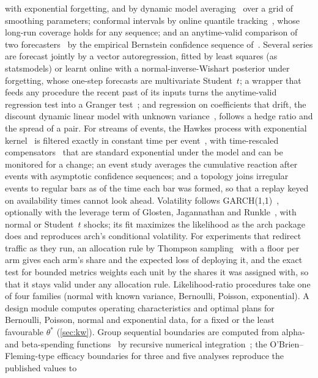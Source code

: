 \documentclass[11pt,a4paper]{article}
\theoremstyle{definition}
\theoremstyle{remark}
\begin{document}
with exponential forgetting, and by dynamic model
averaging~\cite{raftery2010} over a grid of smoothing parameters;
conformal intervals by online quantile
tracking~\cite{gibbs2021,angelopoulos2023}, whose long-run coverage holds
for any sequence; and an anytime-valid comparison of two
forecasters~\cite{choe2024} by the empirical Bernstein confidence
sequence of~\cite{howard2021}. Several series are forecast jointly by a
vector autoregression, fitted by least squares (as statsmodels) or learnt
online with a normal-inverse-Wishart posterior under forgetting, whose
one-step forecasts are multivariate Student~$t$; a wrapper that feeds any
procedure the recent past of its inputs turns the anytime-valid
regression test into a Granger test~\cite{granger1969}; and regression on
coefficients that drift, the discount dynamic linear model with unknown
variance~\cite{west1997}, follows a hedge ratio and the spread of a pair.
For streams of events, the Hawkes process with exponential
kernel~\cite{hawkes1971} is filtered exactly in constant time per
event~\cite{ozaki1979}, with time-rescaled compensators~\cite{brown2002}
that are standard exponential under the model and can be monitored for
a change; an event study averages the cumulative reaction after events
with asymptotic confidence sequences; and a topology joins irregular
events to regular bars as of the time each bar was formed, so that a
replay keyed on availability times cannot look ahead. Volatility follows
GARCH(1,1)~\cite{bollerslev1986}, optionally with the leverage term of
Glosten, Jagannathan and Runkle~\cite{glosten1993}, with normal or Student~$t$
shocks; its fit maximizes the likelihood as the arch package does and
reproduces arch's conditional volatility. For experiments that redirect traffic as they run, an
allocation rule by Thompson sampling~\cite{thompson1933} with a floor per
arm gives each arm's share and the expected loss of deploying it, and the
exact test for bounded metrics weights each unit by the shares it was
assigned with, so that it stays valid under any allocation rule. Likelihood-ratio procedures take one of four
families (normal with known variance, Bernoulli, Poisson, exponential).
A design module computes operating characteristics and optimal plans
for Bernoulli, Poisson, normal and exponential data, for a fixed or the
least favourable $\theta^*$ (\cref{sec:kw}). Group sequential
boundaries are computed from alpha- and beta-spending
functions~\cite{lan1983,jennison2000} by recursive numerical
integration~\cite{armitage1969}; the O'Brien--Fleming-type efficacy
boundaries for three and five analyses reproduce the published values to
\end{document}
